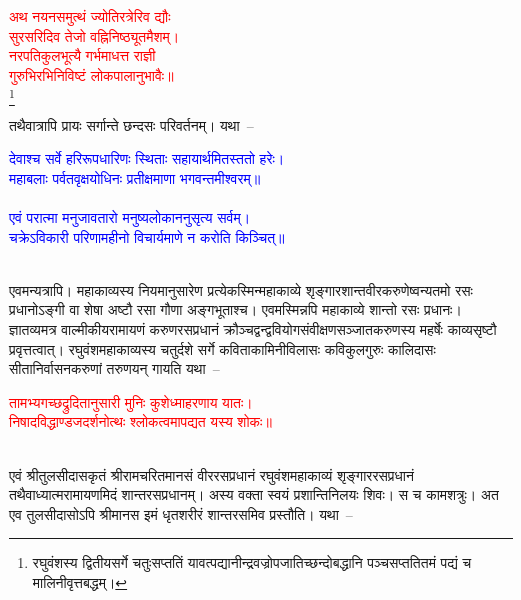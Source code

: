 \centering\textcolor{red}{अथ नयनसमुत्थं ज्योतिरत्रेरिव द्यौः\nopagebreak\\
सुरसरिदिव तेजो वह्निनिष्ठ्यूतमैशम्।\nopagebreak\\
नरपतिकुलभूत्यै गर्भमाधत्त राज्ञी\nopagebreak\\
गुरुभिरभिनिविष्टं लोकपालानुभावैः॥}\nopagebreak\\
\footnote{रघुवंशस्य द्वितीयसर्गे चतुःसप्ततिं यावत्पद्यानीन्द्र\-वज्रोप\-जातिच्छन्दोबद्धानि पञ्चसप्ततितमं पद्यं च मालिनी\-वृत्त\-बद्धम्।}\\
\begin{sloppypar}\justifying\noindent तथैवात्रापि प्रायः सर्गान्ते छन्दसः परिवर्तनम्। यथा~–\end{sloppypar}
\centering\textcolor{blue}{देवाश्च सर्वे हरिरूपधारिणः स्थिताः सहायार्थमितस्ततो हरेः।\nopagebreak\\
महाबलाः पर्वतवृक्षयोधिनः प्रतीक्षमाणा भगवन्तमीश्वरम्॥}\nopagebreak\\
\\
\centering\textcolor{blue}{एवं परात्मा मनुजावतारो मनुष्यलोकाननुसृत्य सर्वम्।\nopagebreak\\
चक्रेऽविकारी परिणामहीनो विचार्यमाणे न करोति किञ्चित्॥}\nopagebreak\\
\\
\begin{sloppypar}\justifying\noindent एवमन्यत्रापि। महा\-काव्यस्य नियमानुसारेण प्रत्येकस्मिन्महाकाव्ये शृङ्गार\-शान्त\-वीर\-करुणेष्वन्यतमो रसः प्रधानोऽङ्गी वा शेषा अष्टौ रसा गौणा अङ्गभूताश्च। एवमस्मिन्नपि महा\-काव्ये शान्तो रसः प्रधानः। ज्ञातव्यमत्र वाल्मीकीय\-रामायणं करुण\-रस\-प्रधानं क्रौञ्च\-द्वन्द्व\-वियोग\-संवीक्षण\-सञ्जात\-करुणस्य महर्षेः काव्य\-सृष्टौ प्रवृत्तत्वात्। रघुवंश\-महा\-काव्यस्य चतुर्दशे सर्गे कविता\-कामिनी\-विलासः कवि\-कुल\-गुरुः कालिदासः सीता\-निर्वासन\-करुणां तरुणयन् गायति यथा~–\end{sloppypar}
\centering\textcolor{red}{तामभ्यगच्छद्रुदितानुसारी मुनिः कुशेध्माहरणाय यातः।\nopagebreak\\
निषादविद्धाण्डजदर्शनोत्थः श्लोकत्वमापद्यत यस्य शोकः॥}\nopagebreak\\
\\
\begin{sloppypar}\justifying\noindent एवं श्रीतुलसीदास\-कृतं श्रीराम\-चरित\-मानसं वीर\-रस\-प्रधानं रघुवंश\-महा\-काव्यं शृङ्गार\-रस\-प्रधानं तथैवाध्यात्म\-रामायणमिदं शान्त\-रस\-प्रधानम्। अस्य वक्ता स्वयं प्रशान्ति\-निलयः शिवः। स च काम\-शत्रुः। अत एव तुलसीदासोऽपि श्रीमानस इमं धृतशरीरं शान्त\-रसमिव प्रस्तौति। यथा~–\end{sloppypar}
